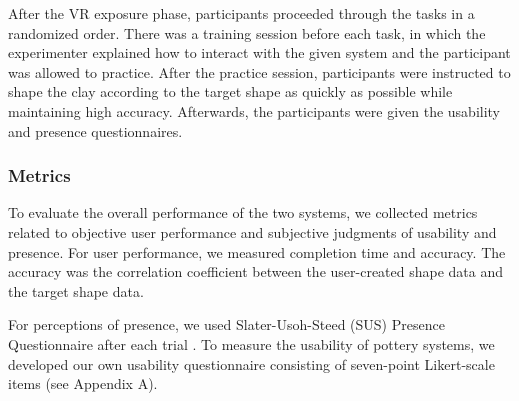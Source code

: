 \documentclass{svjour3}                     %
\begin{document}
After the VR exposure phase, participants proceeded through the tasks in a randomized order. There was a training session before each task, in which the experimenter explained how to interact with the given system and the participant was allowed to practice. After the practice session, participants were instructed to shape the clay according to the target shape as quickly as possible while maintaining high accuracy. Afterwards, the participants were given the usability and presence questionnaires.














\subsubsection{Metrics}
To evaluate the overall performance of the two systems, we collected metrics related to objective user performance and subjective judgments of usability and presence.
For user performance, we measured completion time and accuracy.
The accuracy was the correlation coefficient between the user-created shape data and the target shape data.

For perceptions of presence, we used Slater-Usoh-Steed (SUS) Presence Questionnaire after each trial \cite{slater1994depth}.
To measure the usability of pottery systems, we developed our own usability questionnaire consisting of seven-point Likert-scale items (see Appendix A).
\end{document}
